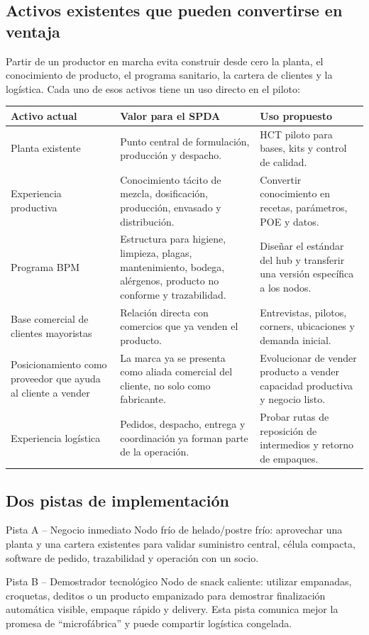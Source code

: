 \documentclass[11pt,a4paper]{article}
\begin{document}
\subsection{Activos existentes que pueden convertirse en ventaja}
Partir de un productor en marcha evita construir desde cero la planta, el conocimiento de producto, el
programa sanitario, la cartera de clientes y la logística. Cada uno de esos activos tiene un uso directo
en el piloto:

{\small
\begin{xltabular}{\textwidth}{@{}P{3.6cm}LL@{}}
\toprule
\textbf{Activo actual} & \textbf{Valor para el SPDA} & \textbf{Uso propuesto}\\ \midrule
Planta existente & Punto central de formulación, producción y despacho. & HCT piloto para bases, kits y control de calidad.\\
Experiencia productiva & Conocimiento tácito de mezcla, dosificación, producción, envasado y distribución. & Convertir conocimiento en recetas, parámetros, POE y datos.\\
Programa BPM & Estructura para higiene, limpieza, plagas, mantenimiento, bodega, alérgenos, producto no conforme y trazabilidad. & Diseñar el estándar del hub y transferir una versión específica a los nodos.\\
Base comercial de clientes mayoristas & Relación directa con comercios que ya venden el producto. & Entrevistas, pilotos, corners, ubicaciones y demanda inicial.\\
Posicionamiento como proveedor que ayuda al cliente a vender & La marca ya se presenta como aliada comercial del cliente, no solo como fabricante. & Evolucionar de vender producto a vender capacidad productiva y negocio listo.\\
Experiencia logística & Pedidos, despacho, entrega y coordinación ya forman parte de la operación. & Probar rutas de reposición de intermedios y retorno de empaques.\\
\bottomrule
\end{xltabular}}

\subsection{Dos pistas de implementación}
\begin{caja}{Pista A -- Negocio inmediato}
Nodo frío de helado/postre frío: aprovechar una planta y una cartera existentes para validar suministro
central, célula compacta, software de pedido, trazabilidad y operación con un socio.
\end{caja}
\begin{caja}{Pista B -- Demostrador tecnológico}
Nodo de snack caliente: utilizar empanadas, croquetas, deditos o un producto empanizado para demostrar
finalización automática visible, empaque rápido y delivery. Esta pista comunica mejor la promesa de
“microfábrica” y puede compartir logística congelada.
\end{caja}
\end{document}
